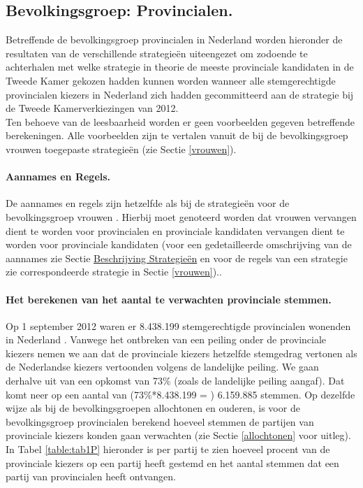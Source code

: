 \subsection{Bevolkingsgroep: Provincialen.} \label{provincialen}
Betreffende de bevolkingsgroep provincialen in Nederland worden hieronder de resultaten van de verschillende strategie\"{e}n uiteengezet om zodoende te achterhalen met welke strategie in theorie de meeste provinciale kandidaten in de Tweede Kamer gekozen hadden kunnen worden wanneer alle stemgerechtigde provincialen kiezers in Nederland zich hadden gecommitteerd aan de strategie bij de Tweede Kamerverkiezingen van 2012.\\
\indent Ten behoeve van de leesbaarheid worden er geen voorbeelden gegeven betreffende berekeningen. Alle voorbeelden zijn te vertalen vanuit de bij de bevolkingsgroep vrouwen toegepaste strategie\"{e}n (zie Sectie \ref{vrouwen}). 

\paragraph{Aannames en Regels.}
De aannames en regels zijn hetzelfde als bij de strategie\"{e}n voor de bevolkingsgroep vrouwen . Hierbij moet genoteerd worden dat vrouwen vervangen dient te worden voor provincialen en provinciale kandidaten vervangen dient te worden voor provinciale kandidaten (voor een gedetailleerde omschrijving van de aannames zie Sectie \hyperref[besS]{Beschrijving Strategie\"{e}n} en voor de regels van een strategie zie correspondeerde strategie in Sectie \ref{vrouwen})..

\paragraph{Het berekenen van het aantal te verwachten provinciale stemmen.}
Op 1 september 2012 waren er 8.438.199 stemgerechtigde provincialen wonenden in Nederland \citep{Kiesraad_uitslag}. Vanwege het ontbreken van een peiling onder de provinciale kiezers nemen we aan dat de provinciale kiezers hetzelfde stemgedrag vertonen als de Nederlandse kiezers vertoonden volgens de landelijke peiling. We gaan derhalve uit van een opkomst van 73\% (zoals de landelijke peiling aangaf). Dat komt neer op een aantal van (73\%*8.438.199 = ) 6.159.885 stemmen. Op dezelfde wijze als bij de bevolkingsgroepen allochtonen en ouderen, is voor de bevolkingsgroep provincialen berekend hoeveel stemmen de partijen van provinciale kiezers konden gaan verwachten (zie Sectie \ref{allochtonen} voor uitleg). In Tabel \ref{table:tab1P} hieronder is per partij te zien hoeveel procent van de provinciale kiezers op een partij heeft gestemd en het aantal stemmen dat een partij van provincialen heeft ontvangen.

